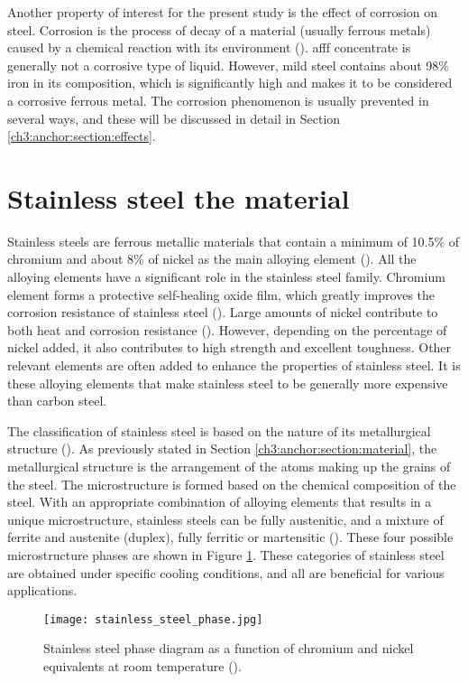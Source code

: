 Another property of interest for the present study is the effect of corrosion on steel. Corrosion is the process of decay of a material (usually ferrous metals) caused by a chemical reaction with its environment (\cite{islam2018effects}). \acrshort{afff} concentrate is generally not a corrosive type of liquid. However, mild steel contains about 98\% iron in its composition, which is significantly high and makes it to be considered a corrosive ferrous metal.  The corrosion phenomenon is usually prevented in several ways, and these will be discussed in detail in Section \ref{ch3:anchor:section:effects}.


\section{Stainless steel the material} 
Stainless steels are ferrous metallic materials that contain a minimum of 10.5\% of chromium and about 8\% of nickel as the main alloying element (\cite{sourmail2005stainless}). All the alloying elements have a significant role in the stainless steel family. Chromium element forms a protective self-healing oxide film, which greatly improves the corrosion resistance of stainless steel (\cite{molabe2018determining}). Large amounts of nickel contribute to both heat and corrosion resistance (\cite{george2002introduction}). However, depending on the percentage of nickel added, it also contributes to high strength and excellent toughness. Other relevant elements are often added to enhance the properties of stainless steel. It is these alloying elements that make stainless steel to be generally more expensive than carbon steel.

The classification of stainless steel is based on the nature of its metallurgical structure (\cite{bhadeshia2017steels}). As previously stated in Section \ref{ch3:anchor:section:material}, the metallurgical structure is the arrangement of the atoms making up the grains of the steel. The microstructure is formed based on the chemical composition of the steel. With an appropriate combination of alloying elements that results in a unique microstructure, stainless steels can be fully austenitic, and a mixture of ferrite and austenite (duplex), fully ferritic or martensitic (\cite{bhadeshia2017steels}). These four possible microstructure phases are shown in Figure \ref{ch3:figure:steel_phase}. These categories of stainless steel are obtained under specific cooling conditions, and all are beneficial for various applications.
 
\begin{figure}[H]
    \centering
    \texttt{[image: stainless\_steel\_phase.jpg]}
    \caption{Stainless steel phase diagram as a function of chromium and nickel equivalents at room temperature (\cite{bhadeshia2017steels}).}
    \label{ch3:figure:steel_phase}
\end{figure}

